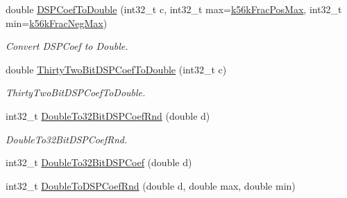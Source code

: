 \begin{DoxyCompactItemize}
double \mbox{\hyperlink{a00449_a5e9c399a10a03718eaaf71cfcddd583f}{D\+S\+P\+Coef\+To\+Double}} (int32\+\_\+t c, int32\+\_\+t max=\mbox{\hyperlink{a00449_aa1f75eeb19dad78b3045cb5778421b61}{k56k\+Frac\+Pos\+Max}}, int32\+\_\+t min=\mbox{\hyperlink{a00449_a3306ddeeab535815290a268837e276b1}{k56k\+Frac\+Neg\+Max}})
\begin{DoxyCompactList}\small\item\em Convert D\+S\+P\+Coef to Double. \end{DoxyCompactList}\item 
double \mbox{\hyperlink{a00449_a52514266bf44c844934aedcd6975037d}{Thirty\+Two\+Bit\+D\+S\+P\+Coef\+To\+Double}} (int32\+\_\+t c)
\begin{DoxyCompactList}\small\item\em Thirty\+Two\+Bit\+D\+S\+P\+Coef\+To\+Double. \end{DoxyCompactList}\item 
int32\+\_\+t \mbox{\hyperlink{a00449_ab8477bacb0294598f49057507fb17810}{Double\+To32\+Bit\+D\+S\+P\+Coef\+Rnd}} (double d)
\begin{DoxyCompactList}\small\item\em Double\+To32\+Bit\+D\+S\+P\+Coef\+Rnd. \end{DoxyCompactList}\item 
int32\+\_\+t \mbox{\hyperlink{a00449_ac7d80281cdc671669f3f2d523b2960cf}{Double\+To32\+Bit\+D\+S\+P\+Coef}} (double d)
\item 
int32\+\_\+t \mbox{\hyperlink{a00449_a3db78a10d239924fd403b9d2fed5b296}{Double\+To\+D\+S\+P\+Coef\+Rnd}} (double d, double max, double min)
\end{DoxyCompactItemize}
